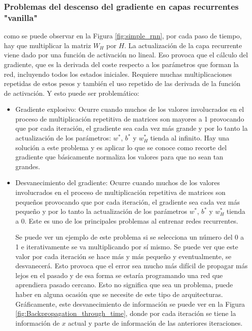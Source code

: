 \subsubsection{Problemas del descenso del gradiente en capas recurrentes "vanilla"}
como se puede observar en la Figura \ref{fig:simple_rnn}, por cada paso de tiempo, hay que multiplicar la matriz $W_H$ por $H$. La actualización de la capa recurrente viene dado por una función de activación no lineal. Eso provoca que el cálculo del gradiente, que es la derivada del coste respecto a los parámetros que forman la red, incluyendo todos los estados iniciales. Requiere muchas multiplicaciones repetidas de estos pesos y también el uso repetido de las derivada de la función de activación. Y esto puede ser problemático:

\begin{itemize}
    \item Gradiente explosivo: Ocurre cuando muchos de los valores involucrados en el proceso de multiplicación repetitiva de matrices son mayores a 1 provocando que por cada iteración, el gradiente sea cada vez más grande y por lo tanto la actualización de los parámetros: $w^*$, $b^*$ y $w_H^*$ tienda al infinito. Hay una solución a este problema y es aplicar lo que se conoce como recorte del gradiente que básicamente normaliza los valores para que no sean tan grandes.
    \item Desvanecimiento del gradiente: Ocurre cuando muchos de los valores involucrados en el proceso de multiplicación repetitiva de matrices son pequeños provocando que por cada iteración, el gradiente sea cada vez más pequeño y por lo tanto la actualización de los parámetros $w^*$, $b^*$ y $w_H^*$ tienda a $0$. Este es uno de los principales problemas al entrenar redes recurrentes. 
    \newline
    
    Se puede ver un ejemplo de este problema si se selecciona un número del 0 a 1 e iterativamente se va multiplicando por sí mismo. Se puede ver que este valor por cada iteración se hace más y más pequeño y eventualmente, se desvanecerá. Esto provoca que el error sea mucho más difícil de propagar más lejos en el pasado y de esa forma se estaría programando una red que aprendiera pasado cercano. Esto no significa que sea un problema, puede haber en alguna ocasión que se necesite de este tipo de arquitecturas. Gráficamente, este desvanecimiento de información se puede ver en la Figura \ref{fig:Backpropagation_through_time}, donde por cada iteración se tiene la información de $x$ actual y parte de información de las anteriores iteraciones.
    

\end{itemize}
